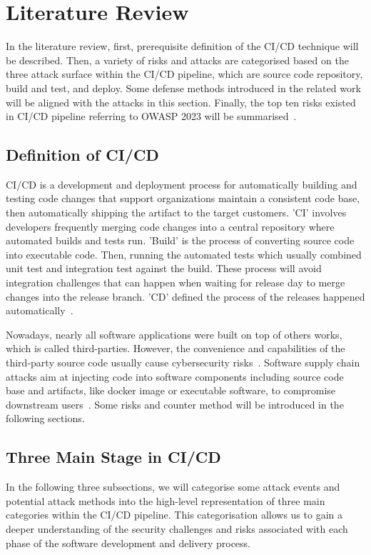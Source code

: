\section{Literature Review}
In the literature review, first, prerequisite definition of the CI/CD technique will be 
described. Then, a variety of risks and attacks are categorised based on the three attack 
surface within the CI/CD pipeline, which are source code repository, build and test, and deploy.
Some defense methods introduced in the related work will be aligned with the attacks in this 
section. Finally, the top ten risks existed in CI/CD pipeline referring to OWASP 2023 will be 
summarised~\cite{OWASP2023}.

\subsection{Definition of CI/CD}
CI/CD is a development and deployment process for automatically building and testing code
changes that support organizations maintain a consistent code base, then automatically shipping 
the artifact to the target customers. 'CI' involves developers frequently merging code changes 
into a central repository where automated builds and tests run. 'Build' is the process of 
converting source code into executable code. Then, running the automated tests which usually 
combined unit test and integration test against the build. These process will avoid integration 
challenges that can happen when waiting for release day to merge changes into the release branch. 
'CD' defined the process of the releases happened automatically~\cite{DoDDefCI/CD2023}. 

Nowadays, nearly all software applications were built on top of others works, which is called third-parties.
However, the convenience and capabilities of the third-party source code usually cause cybersecurity 
risks~\cite{mastrangelo2015use}. Software supply chain attacks aim at injecting code into software
components including source code base and artifacts, like docker image or executable software,
to compromise downstream users~\cite{ladisa2023sok}. 
Some risks and counter method will be introduced in the following sections.

\subsection{Three Main Stage in CI/CD}
In the following three subsections, 
we will categorise some attack events and potential attack methods into the high-level representation 
of three main categories within the CI/CD pipeline. This categorisation allows us to gain a deeper understanding of 
the security challenges and risks associated with each phase of the software development and delivery process.

